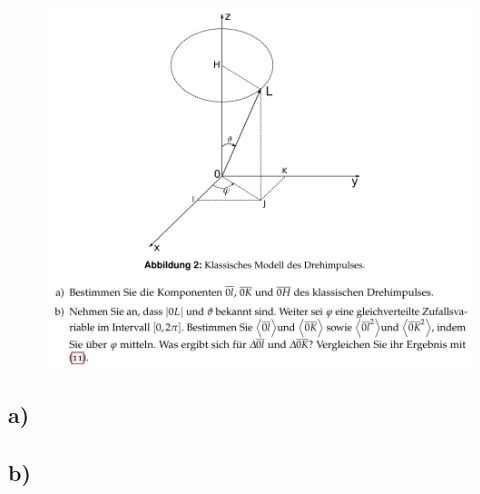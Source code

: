     \begin{figure}[H]
        \centering
        \includegraphics[width=\textwidth]{images/Aufgabe4b.jpg}
        \label{fig:9}
    \end{figure}

    \subsection{a)}

    \subsection{b)}









